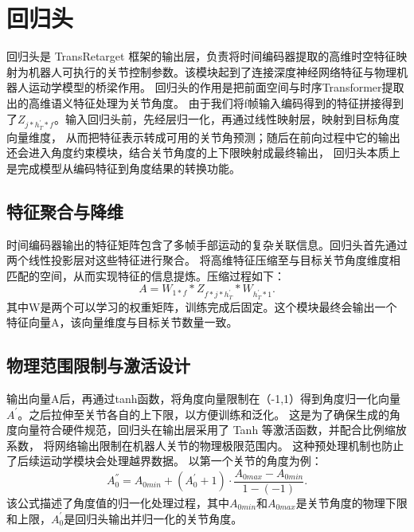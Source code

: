 \section{回归头}
回归头是 TransRetarget 框架的输出层，负责将时间编码器提取的高维时空特征映射为机器人可执行的关节控制参数。该模块起到了连接深度神经网络特征与物理机器人运动学模型的桥梁作用。
回归头的作用是把前面空间与时序Transformer提取出的高维语义特征处理为关节角度。
由于我们将f帧输入编码得到的特征拼接得到了$Z_{j*h^{'}_{T}*f}$。输入回归头前，先经层归一化，再通过线性映射层，映射到目标角度向量维度，
从而把特征表示转成可用的关节角预测；随后在前向过程中它的输出还会进入角度约束模块，结合关节角度的上下限映射成最终输出，
回归头本质上是完成模型从编码特征到角度结果的转换功能。
\subsection{特征聚合与降维}
时间编码器输出的特征矩阵包含了多帧手部运动的复杂关联信息。回归头首先通过两个线性投影层对这些特征进行聚合。
将高维特征压缩至与目标关节角度维度相匹配的空间，从而实现特征的信息提炼。压缩过程如下：
\begin{equation}
A = W_{1*f} * Z_{f*j*h^{'}_{T}} * W_{h^{'}_{T}*1}.
\end{equation}
其中W是两个可以学习的权重矩阵，训练完成后固定。这个模块最终会输出一个特征向量A，该向量维度与目标关节数量一致。
\subsection{物理范围限制与激活设计}
输出向量A后，再通过tanh函数，将角度向量限制在（-1,1）得到角度归一化向量$A^{'}$。之后拉伸至关节各自的上下限，以方便训练和泛化。
这是为了确保生成的角度向量符合硬件规范，回归头在输出层采用了 Tanh 等激活函数，并配合比例缩放系数，
将网络输出限制在机器人关节的物理极限范围内。
这种预处理机制也防止了后续运动学模块会处理越界数据。
以第一个关节的角度为例：
\begin{equation}
A_0^{''} = A_{0min} + (A_0^{'} + 1) \cdot \frac{A_{0max} - A_{0min}}{1 - (-1)}.
\end{equation}
该公式描述了角度值的归一化处理过程，其中$A_{0min}$和$A_{0max}$是关节角度的物理下限和上限，$A_0^{'}$是回归头输出并归一化的关节角度。
